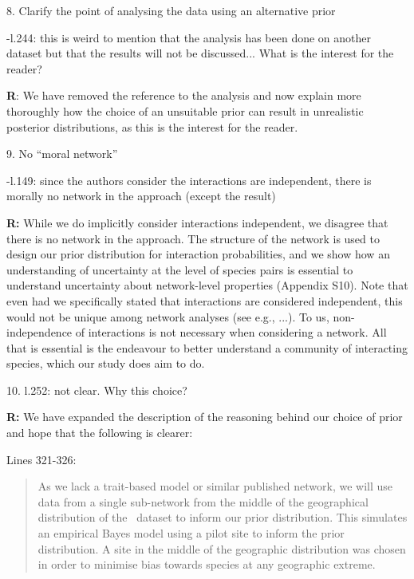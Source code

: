 \documentclass[12pt]{letter}
\newenvironment{refquote}{\bigskip \begin{it}}{\end{it}\smallskip}
\begin{document}
	8. Clarify the point of analysing the data using an alternative prior 

		
		\begin{refquote}	
			-l.244: this is weird to mention that the analysis has been done on another dataset but that the results will not be discussed... What is the interest for the reader?
		\end{refquote}


		\textbf{R}: We have removed the reference to the analysis and now explain more thoroughly how the choice of an unsuitable prior can result in unrealistic posterior distributions, as this is the interest for the reader.


	9. No ``moral network'' 


		\begin{refquote}
			-l.149: since the authors consider the interactions are independent, there is morally no network in the approach (except the result)
		\end{refquote}


		\textbf{R:} While we do implicitly consider interactions independent, we disagree that there is no network in the approach. The structure of the network is used to design our prior distribution for interaction probabilities, and we show how an understanding of uncertainty at the level of species pairs is essential to understand uncertainty about network-level properties (Appendix S10). Note that even had we specifically stated that interactions are considered independent, this would not be unique among network analyses (see e.g., ...). To us, non-independence of interactions is not necessary when considering a network. All that is essential is the endeavour to better understand a community of interacting species, which our study does aim to do. 


	10. l.252: not clear. Why this choice?


		\textbf{R:} We have expanded the description of the reasoning behind our choice of prior and hope that the following is clearer:


		Lines 321-326:


		\begin{quotation}
			As we lack a trait-based model or similar published network, we will use data from a single sub-network from the middle of the geographical distribution of the~\citet{Kopelke2017} dataset to inform our prior distribution. This simulates an empirical Bayes model using a pilot site to inform the prior distribution. A site in the middle of the geographic distribution was chosen in order to minimise bias towards species at any geographic extreme.
		\end{quotation}
\end{document}
